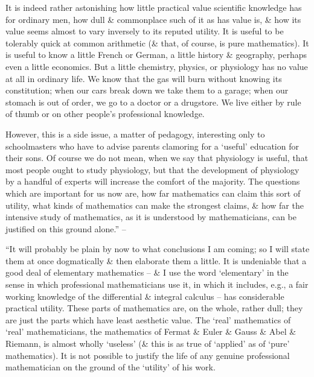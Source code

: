 \documentclass{article}
\numberwithin{equation}{section}
\begin{document}
It is indeed rather astonishing how little practical value scientific knowledge has for ordinary men, how dull \& commonplace such of it as has value is, \& how its value seems almost to vary inversely to its reputed utility. It is useful to be tolerably quick at common arithmetic (\& that, of course, is pure mathematics). It is useful to know a little French or German, a little history \& geography, perhaps even a little economics. But a little chemistry, physics, or physiology has no value at all in ordinary life. We know that the gas will burn without knowing its constitution; when our cars break down we take them to a garage; when our stomach is out of order, we go to a doctor or a drugstore. We live either by rule of thumb or on other people's professional knowledge.

However, this is a side issue, a matter of pedagogy, interesting only to schoolmasters who have to advise parents clamoring for a `useful' education for their sons. Of course we do not mean, when we say that physiology is useful, that most people ought to study physiology, but that the development of physiology by a handful of experts will increase the comfort of the majority. The questions which are important for us now are, how far mathematics can claim this sort of utility, what kinds of mathematics can make the strongest claims, \& how far the intensive study of mathematics, as it is understood by mathematicians, can be justified on this ground alone.'' -- \cite[pp. 117--119]{Hardy1992}

 ``It will probably be plain by now to what conclusions I am coming; so I will state them at once dogmatically \& then elaborate them a little. It is undeniable that a good deal of elementary mathematics -- \& I use the word `elementary' in the sense in which professional mathematicians use it, in which it includes, e.g., a fair working knowledge of the differential \& integral calculus -- has considerable practical utility. These parts of mathematics are, on the whole, rather dull; they are just the parts which have least aesthetic value. The `real' mathematics of `real' mathematicians, the mathematics of Fermat \& Euler \& Gauss \& Abel \& Riemann, is almost wholly `useless' (\& this is as true of `applied' as of `pure' mathematics). It is not possible to justify the life of any genuine professional mathematician on the ground of the `utility' of his work.
\end{document}
